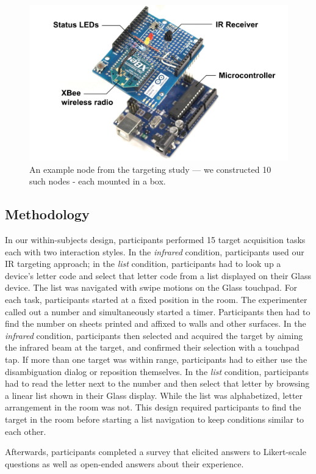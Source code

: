 \begin{figure}[b]
\centering
\includegraphics[width=0.8\columnwidth]{figures/study-node.pdf}
\caption{An example node from the targeting study --- we constructed 10 such nodes - each mounted in a box.}
\label{fig:targeting-study-layout}
\end{figure}

\subsection{Methodology}
In our within-subjects design, participants performed 15 target acquisition tasks each with two interaction styles. In the {\em infrared} condition, participants used our IR targeting approach; in the {\em list} condition, participants had to look up a device's letter code and select that letter code from a list displayed on their Glass device. The list was navigated with swipe motions on the Glass touchpad. For each task, participants started at a fixed position in the room. The experimenter called out a number and simultaneously started a timer. Participants then had to find the number on sheets printed and affixed to walls and other surfaces. In the {\em infrared} condition, participants then selected and acquired the target by aiming the infrared beam at the target, and confirmed their selection with a touchpad tap. If more than one target was within range, participants had to either use the disambiguation dialog or reposition themselves. In the {\em list} condition, participants had to read the letter next to the number and then select that letter by browsing a linear list shown in their Glass display. While the list was alphabetized, letter arrangement in the room was not. This design required participants to find the target in the room before starting a list navigation to keep conditions similar to each other.

Afterwards, participants completed a survey that elicited answers to Likert-scale questions as well as open-ended answers about their experience.


